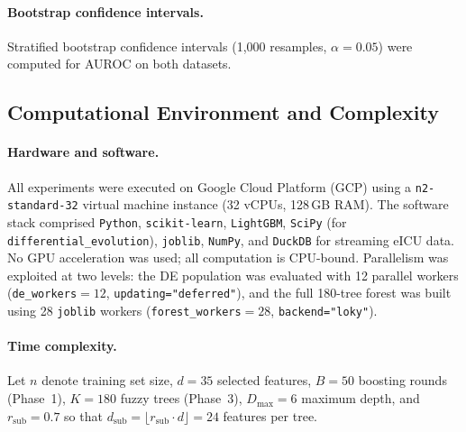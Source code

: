 \documentclass[a4paper,fleqn,longmktitle]{cas-sc}
\begin{document}
	\paragraph{Bootstrap confidence intervals.}
	Stratified bootstrap confidence intervals (1{,}000 resamples,
	$\alpha = 0.05$) were computed for AUROC on both datasets.

	\subsection{Computational Environment and Complexity}
	\label{sec:compute}

	\paragraph{Hardware and software.}
	All experiments were executed on Google Cloud Platform (GCP)
	using a \texttt{n2-standard-32} virtual machine instance
	(32 vCPUs, 128\,GB RAM).
	The software stack comprised \texttt{Python},
	\texttt{scikit-learn}, \texttt{LightGBM},
	\texttt{SciPy} (for \texttt{differential\_evolution}),
	\texttt{joblib}, \texttt{NumPy}, and
	\texttt{DuckDB} for streaming eICU data.
	No GPU acceleration was used; all computation is CPU-bound.
	Parallelism was exploited at two levels: the DE population
	was evaluated with 12 parallel workers
	(\texttt{de\_workers}$=12$, \texttt{updating="deferred"}),
	and the full 180-tree forest was built using 28 \texttt{joblib}
	workers (\texttt{forest\_workers}$=28$, \texttt{backend="loky"}).

	\paragraph{Time complexity.}
	Let $n$ denote training set size, $d = 35$ selected features,
	$B = 50$ boosting rounds (Phase~1),
	$K = 180$ fuzzy trees (Phase~3), $D_{\max} = 6$ maximum depth,
	and $r_{\text{sub}} = 0.7$ so that $d_{\text{sub}} =
	\lfloor r_{\text{sub}} \cdot d \rfloor = 24$ features per tree.
\end{document}
